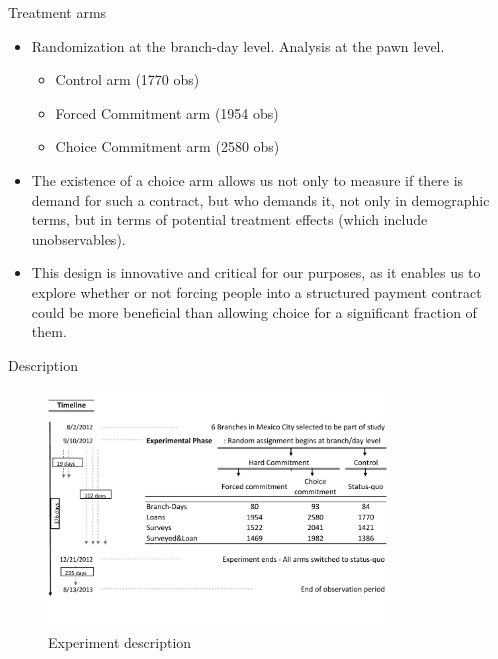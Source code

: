 \documentclass[8pt]{beamer}
\begin{document}
\begin{frame}{Treatment arms}
\label{treatment_arms}
   \begin{itemize}
    \vfill \item Randomization at the branch-day level.  Analysis at the pawn level.
    \begin{itemize}
        \vfill \item Control arm (1770 obs)
       \vfill \item Forced Commitment arm (1954 obs)
       \vfill \item Choice Commitment arm (2580 obs)
    \end{itemize}
    \vfill \item The existence of a choice arm allows us not only to measure if there is demand for such a contract, but who demands it, not only in demographic terms, but in terms of potential treatment effects (which include unobservables).
   \vfill \item  This design is innovative and critical for our purposes, as it enables us to explore whether or not forcing people into a structured payment contract could be more beneficial than allowing choice for a significant fraction of them.
\end{itemize}
\end{frame}


 \begin{frame}{Description}
 \label{consort}
 \begin{figure}[H]
      \caption{Experiment description}
     \label{exp_description}
 \begin{center}
         \includegraphics[width=0.80\textwidth]{Figuras/consort.pdf}
   \end{center}
 \end{figure}

 \end{frame}
\end{document}
